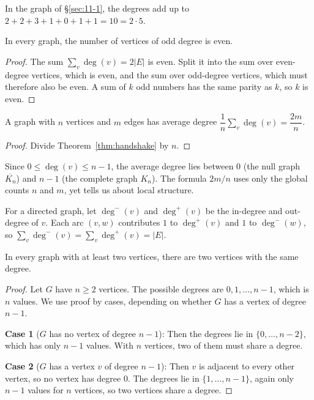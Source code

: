 \begin{example}
In the graph of \S\ref{sec:11-1}, the degrees add up to $2+2+3+1+0+1+1=10=2\cdot5$.
\end{example}

\begin{corollary}
\label{cor:odd-degree}
In every graph, the number of vertices of odd degree is even.
\end{corollary}
\begin{proof}
The sum $\sum_v\deg(v)=2|E|$ is even. Split it into the sum over even-degree vertices, which is even, and the sum over odd-degree vertices, which must therefore also be even. A sum of $k$ odd numbers has the same parity as $k$, so $k$ is even.
\end{proof}

\begin{corollary}
\label{cor:avg-degree}
A graph with $n$ vertices and $m$ edges has average degree $\dfrac1n\sum_{v}\deg(v) = \dfrac{2m}{n}$.
\end{corollary}
\begin{proof}
Divide Theorem~\ref{thm:handshake} by $n$.
\end{proof}

\begin{note}
Since $0\le\deg(v)\le n-1$, the average degree lies between $0$ (the null graph $\overline{K_n}$) and $n-1$ (the complete graph $K_n$). The formula $2m/n$ uses only the global counts $n$ and $m$, yet tells us about local structure.
\end{note}

\begin{note}
For a directed graph, let $\deg^-(v)$ and $\deg^+(v)$ be the in-degree and out-degree of $v$. Each arc $(v,w)$ contributes $1$ to $\deg^+(v)$ and $1$ to $\deg^-(w)$, so $\sum_v\deg^-(v)=\sum_v\deg^+(v)=|E|$.
\end{note}

\bigskip
\begin{theorem}[CN Thm 56]
\label{thm:equal-degree}
In every graph with at least two vertices, there are two vertices with the same degree.
\end{theorem}
\begin{proof}
Let $G$ have $n\ge2$ vertices. The possible degrees are $0,1,\dots,n-1$, which is $n$ values. We use proof by cases, depending on whether $G$ has a vertex of degree $n-1$.

\textbf{Case 1} ($G$ has no vertex of degree $n-1$): Then the degrees lie in $\{0,\dots,n-2\}$, which has only $n-1$ values. With $n$ vertices, two of them must share a degree.

\textbf{Case 2} ($G$ has a vertex $v$ of degree $n-1$): Then $v$ is adjacent to every other vertex, so no vertex has degree $0$. The degrees lie in $\{1,\dots,n-1\}$, again only $n-1$ values for $n$ vertices, so two vertices share a degree.
\end{proof}

